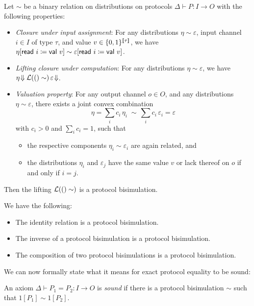 \begin{lemma}\label{lem:protocol_seed}
Let $\sim$ be a binary relation on distributions on protocols $\Delta \vdash P : I \to O$ with the following properties:
\begin{itemize}
\item \emph{Closure under input assignment}: For any distributions $\eta \sim \varepsilon$, input channel $i \in I$ of type $\tau$, and value $v \in \{0,1\}^{\llbracket \tau \rrbracket}$, we have $\eta[\mathsf{read} \ i \coloneqq \mathsf{val} \ v] \sim \varepsilon[\mathsf{read} \ i \coloneqq \mathsf{val} \ v]$.

\item \emph{Lifting closure under computation}: For any distributions $\eta \sim \varepsilon$, we have $\eta \! \Downarrow \mathcal{L}(()\sim) \, \varepsilon \! \Downarrow$.

\item \emph{Valuation property}: For any output channel $o \in O$, and any distributions $\eta \sim \varepsilon$, there exists a joint convex combination \[\eta = \sum_i c_i \, \eta_i \; \sim \, \sum_i c_i \, \varepsilon_i = \varepsilon\]
with $c_i > 0$ and $\sum_i c_i = 1$, such that
\begin{itemize}
\item the respective components $\eta_i \sim \varepsilon_i$ are again related, and
\item the distributions $\eta_i$ and $\varepsilon_j$ have the same value $v$ or lack thereof on $o$ if and only if $i = j$.
\end{itemize}
\end{itemize}
Then the lifting $\mathcal{L}(()\sim)$ is a protocol bisimulation.
\end{lemma}

\begin{lemma}
We have the following: 
\begin{itemize}
\item The identity relation is a protocol bisimulation.
\item The inverse of a protocol bisimulation is a protocol bisimulation.
\item The composition of two protocol bisimulations is a protocol bisimulation.
\end{itemize}
\end{lemma}

\noindent We can now formally state what it means for exact protocol equality to be sound:

\begin{definition}
An axiom $\Delta \vdash P_1 = P_2 : I \to O$ is \emph{sound} if there is a protocol bisimulation $\sim$ such that $1[P_1] \sim 1[P_2]$.
\end{definition}

